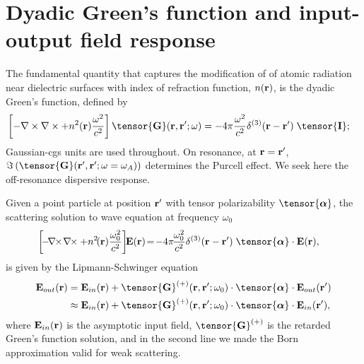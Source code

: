 \documentclass[preprint,aps,pra,onecolumn]{revtex4-1} %
\begin{document}
\section{Dyadic Green's function and input-output field response}
The fundamental quantity that captures the modification of of atomic radiation near dielectric surfaces 
with index of refraction function, $n(\mathbf{r})$, is the dyadic Green's function, defined by
 \begin{align}
\left[ -\nabla\times\nabla\times + n^2(\mbf{r}) \frac{\omega^2}{c^2} \right] \tensor{\mathbf{G}}(\br, \br';\omega) &= -4 \pi 
\frac{\omega^2}{c^2} \delta^{(3)}(\mathbf{r}-\mathbf{r}')\;\tensor{\mathbf{I}};
\end{align}
Gaussian-cgs units are used throughout.  On resonance, at $\mathbf{r}=\mathbf{r}'$, 
$\Im\left(\tensor{\mathbf{G}}(\br', \br'; \omega= \omega_A) \right)$ determines the Purcell effect.  We 
seek here the off-resonance dispersive response.

Given a point particle at position $\mathbf{r}'$ with tensor polarizability $\tensor{\boldsymbol{\alpha}}$, the  
scattering solution to wave equation at frequency $\omega_0$
\begin{align}\label{eq:Maxwellwithsource2}
\left[\! -\! \nabla\!\!\times\!\nabla\!\!\times + n^2\!(\br)\frac{\omega_0^2}{c^2}  \right]\!\! \mathbf{E}(\br) &\!=\! -4\pi\! \frac{\omega_0^2}{c^2} 
\delta^{(3)}(\br-\br')\;  \tensor{\boldsymbol{\alpha}}\cdot \mathbf{E}(\br),
\end{align}
is given by the Lipmann-Schwinger equation
\begin{align}
\mathbf{E}_{out}(\br) &=\mathbf{E}_{in}(\br)+\tensor{\mathbf{G}}^{(+)}(\br , \br'; \omega_0)\cdot 
\tensor{\boldsymbol{\alpha}}\cdot \mathbf{E}_{out}(\br')\\
&\approx \mathbf{E}_{in}(\br)+ \tensor{\mathbf{G}}^{(+)}(\br , \br'; \omega_0) \cdot 
\tensor{\boldsymbol{\alpha}}\cdot \mathbf{E}_{in}(\br'),
\end{align}
where $\mathbf{E}_{in}(\mathbf{r})$ is the asymptotic input field, $\tensor{\mathbf{G}}^{(+)}$ is the retarded 
Green's function solution, and in the second line we made the Born approximation valid for weak 
scattering.  
\end{document}
